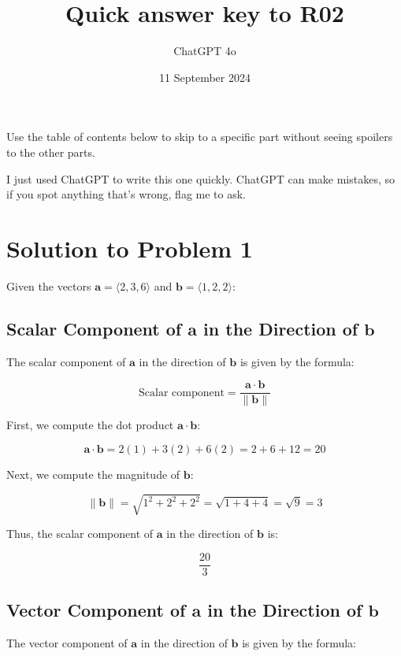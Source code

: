\documentclass[11pt]{article}
\begin{document}
\title{Quick answer key to R02}
\author{ChatGPT 4o}
\date{11 September 2024}
\maketitle

Use the table of contents below to skip to a specific part
without seeing spoilers to the other parts.

I just used ChatGPT to write this one quickly.
ChatGPT can make mistakes, so if you spot anything that's wrong, flag me to ask.

\tableofcontents

\newpage

\section{Solution to Problem 1}

Given the vectors $\mathbf{a} = \langle 2, 3, 6 \rangle$ and $\mathbf{b} = \langle 1, 2, 2 \rangle$:

\subsection{Scalar Component of $\mathbf{a}$ in the Direction of $\mathbf{b}$}

The scalar component of $\mathbf{a}$ in the direction of $\mathbf{b}$ is given by the formula:

\[
\text{Scalar component} = \frac{\mathbf{a} \cdot \mathbf{b}}{\|\mathbf{b}\|}
\]

First, we compute the dot product $\mathbf{a} \cdot \mathbf{b}$:

\[
\mathbf{a} \cdot \mathbf{b} = 2(1) + 3(2) + 6(2) = 2 + 6 + 12 = 20
\]

Next, we compute the magnitude of $\mathbf{b}$:

\[
\|\mathbf{b}\| = \sqrt{1^2 + 2^2 + 2^2} = \sqrt{1 + 4 + 4} = \sqrt{9} = 3
\]

Thus, the scalar component of $\mathbf{a}$ in the direction of $\mathbf{b}$ is:

\[
\frac{20}{3}
\]

\newpage

\subsection{Vector Component of $\mathbf{a}$ in the Direction of $\mathbf{b}$}

The vector component of $\mathbf{a}$ in the direction of $\mathbf{b}$ is given by the formula:
\end{document}
